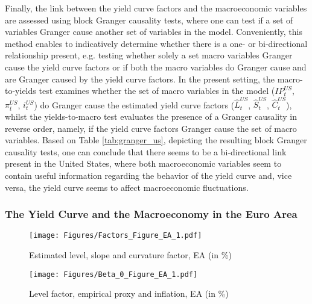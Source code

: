 Finally, the link between the yield curve factors and the macroeconomic variables are assessed using block Granger causality tests, where one can test if a set of variables Granger cause another set of variables in the model. 
Conveniently, this method enables to indicatively determine whether there is a one- or bi-directional relationship present, e.g. testing whether solely a set macro variables Granger cause the yield curve factors or if both the macro variables do Granger cause and are Granger caused by the yield curve factors. 
In the present setting, the macro-to-yields test examines whether the set of macro variables in the model ($IP^{US}_{t}$, $\pi^{US}_{t}$, $i^{US}_{t}$) do Granger cause the estimated yield curve factors ($\hat{L}^{US}_{t}$, $\hat{S}^{US}_{t}$, $\hat{C}^{US}_{t}$), whilst the yields-to-macro test evaluates the presence of a Granger causality in reverse order, namely, if the yield curve factors Granger cause the set of macro variables. 
Based on Table \ref{tab:granger_us}, depicting the resulting block Granger causality tests, one can conclude that there seems to be a bi-directional link present in the United States, where both macroeconomic variables seem to contain useful information regarding the behavior of the yield curve and, vice versa, the yield curve seems to affect macroeconomic fluctuations. 



\subsubsection{The Yield Curve and the Macroeconomy in the Euro Area}
\label{sec:analysis_ea}

\begin{figure}[!t]
    \centering
    \texttt{[image: Figures/Factors\_Figure\_EA\_1.pdf]}
    \caption{Estimated level, slope and curvature factor, EA (in \%)}
    \label{fig:factors_ea}
\end{figure}

\begin{figure}[!t]
    \centering
    \texttt{[image: Figures/Beta\_0\_Figure\_EA\_1.pdf]}
    \caption{Level factor, empirical proxy and inflation, EA (in \%)}
    \label{fig:level_factor_ea}
\end{figure}

